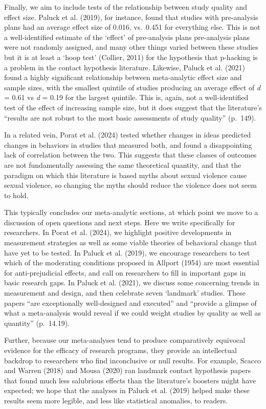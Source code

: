 \documentclass[
  ,jou]{apa6}
\begin{document}
Finally, we aim to include tests of the relationship between study quality and effect size. Paluck et al. (2019), for instance, found that studies with pre-analysis plans had an average effect size of 0.016, vs.~0.451 for everything else. This is not a well-identified estimate of the `effect' of pre-analysis plans \textemdash pre-analysis plans were not randomly assigned, and many other things varied between these studies \textemdash but it is at least a `hoop test' (Collier, 2011) for the hypothesis that p-hacking is a problem in the contact hypothesis literature. Likewise, Paluck et al. (2021) found a highly significant relationship between meta-analytic effect size and sample sizes, with the smallest quintile of studies producing an average effect of \emph{d} = 0.61 vs \emph{d} = 0.19 for the largest quintile. This is, again, not a well-identified test of the effect of increasing sample size, but it does suggest that the literature's ``results are not robust to the most basic assessments of study quality'' (p.~149).

In a related vein, Porat et al. (2024) tested whether changes in ideas predicted changes in behaviors in studies that measured both, and found a disappointing lack of correlation between the two. This suggests that these classes of outcomes are not fundamentally assessing the same theoretical quantity, and that the paradigm on which this literature is based \textemdash myths about sexual violence cause sexual violence, so changing the myths should reduce the violence \textemdash does not seem to hold.

This typically concludes our meta-analytic sections, at which point we move to a discussion of open questions and next steps. Here we write specifically for researchers. In Porat et al. (2024), we highlight positive developments in measurement strategies as well as some viable theories of behavioral change that have yet to be tested. In Paluck et al. (2019), we encourage researchers to test which of the moderating conditions proposed in Allport (1954) are most essential for anti-prejudicial effects, and call on researchers to fill in important gaps in basic research gaps. In Paluck et al. (2021), we discuss some concerning trends in measurement and design, and then celebrate seven `landmark' studies. These papers ``are exceptionally well-designed and executed'' and ``provide a glimpse of what a meta-analysis would reveal if we could weight studies by quality as well as quantity'' (p.~14.19).

Further, because our meta-analyses tend to produce comparatively equivocal evidence for the efficacy of research programs, they provide an intellectual backdrop to researchers who find inconclusive or null results. For example, Scacco and Warren (2018) and Mousa (2020) ran landmark contact hypothesis papers that found much less salubrious effects than the literature's boosters might have expected; we hope that the analyses in Paluck et al. (2019) helped make these results seem more legible, and less like statistical anomalies, to readers.
\end{document}
